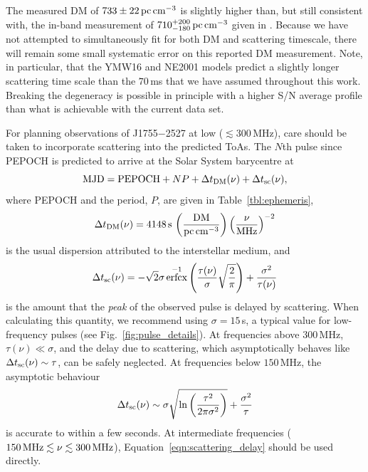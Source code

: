 \documentclass[fleqn,usenatbib]{mnras}
\newcommand{\src}{J1755$-$2527}
\DeclareMathOperator{\erfcx}{erfcx}
\newcommand{\Fig}{Fig.}
\newcommand{\Tab}{Table}
\newcommand{\Eqn}{Equation}
\begin{document}
The measured DM of $733 \pm 22\,{\rm pc}\,{\rm cm}^{-3}$ is slightly higher than, but still consistent with, the in-band measurement of $710^{+200}_{-180}\,{\rm pc}\,{\rm cm}^{-3}$ given in .
Because we have not attempted to simultaneously fit for both DM and scattering timescale, there will remain some small systematic error on this reported DM measurement.
Note, in particular, that the YMW16 and NE2001 models predict a slightly longer scattering time scale than the $70\,$ms that we have assumed throughout this work.
Breaking the degeneracy is possible in principle with a higher S/N average profile than what is achievable with the current data set.

For planning observations of \src{} at low ($\lesssim 300$\,MHz), care should be taken to incorporate scattering into the predicted ToAs.
The $N$th pulse since PEPOCH is predicted to arrive at the Solar System barycentre at
\begin{equation}
    {\rm MJD} = {\rm PEPOCH} + NP + \Delta t_{\rm DM}(\nu) + \Delta t_{\rm sc}(\nu),
    \label{eqn:timing}
\end{equation}
where PEPOCH and the period, $P$, are given in \Tab~\ref{tbl:ephemeris},
\begin{equation}
    \Delta t_{\rm DM}(\nu) = 4148\,{\rm s} \, \left(\frac{\rm DM}{{\rm pc\,cm}^{-3}}\right) \left(\frac{\nu}{\rm MHz}\right)^{-2}
\end{equation}
is the usual dispersion attributed to the interstellar medium, and
\begin{equation}
    \Delta t_{\rm sc}(\nu) = -\sqrt{2}\sigma\erfcx^{-1}\left(\frac{\tau(\nu)}{\sigma}\sqrt{\frac{2}{\pi}}\right) + \frac{\sigma^2}{\tau(\nu)}
    \label{eqn:scattering_delay}
\end{equation}
is the amount that the \emph{peak} of the observed pulse is delayed by scattering.
When calculating this quantity, we recommend using $\sigma = 15\,$s, a typical value for low-frequency pulses (see \Fig~\ref{fig:pulse_details}).
At frequencies above $300\,$MHz, $\tau(\nu) \ll \sigma$, and the delay due to scattering, which asymptotically behaves like $\Delta t_{\rm sc}(\nu) \sim \tau$, can be safely neglected.
At frequencies below $150\,$MHz, the asymptotic behaviour
\begin{equation}
    \Delta t_{\rm sc}(\nu) \sim \sigma \sqrt{\ln \left(\frac{\tau^2}{2\pi \sigma^2}\right)} + \frac{\sigma^2}{\tau}
\end{equation}
is accurate to within a few seconds.
At intermediate frequencies ($150\,{\rm MHz} \lesssim \nu \lesssim 300\,{\rm MHz}$), \Eqn~\ref{eqn:scattering_delay} should be used directly.
\end{document}
